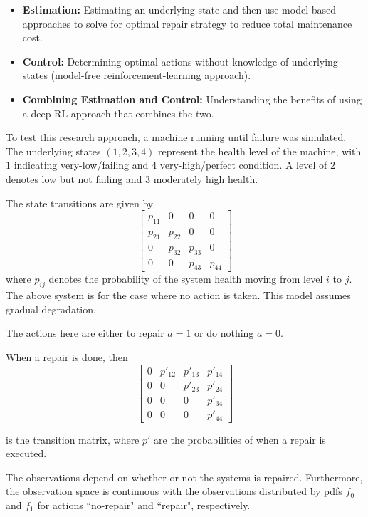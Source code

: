 \documentclass[english]{article}
\numberwithin{equation}{section}
\begin{document}
	\begin{itemize}
		\item \textbf{Estimation:} Estimating an underlying state and then use model-based approaches to solve for optimal repair strategy to reduce total maintenance cost.
		\item \textbf{Control:} Determining optimal actions without knowledge of underlying states (model-free reinforcement-learning approach).
		\item \textbf{Combining Estimation and Control:} Understanding the benefits of using a deep-RL approach that combines the two.
	\end{itemize}
	
	
	To test this research approach, a machine running until failure was simulated. The underlying states $(1,2,3,4)$ represent the health level of the machine, with $1$ indicating very-low/failing and $4$ very-high/perfect condition. A level of $2$ denotes low but not failing and $3$ moderately high health.
	
	The state transitions are given by 
	$$
	\begin{bmatrix}
	p_{11} & 0 & 0 & 0 \\
	p_{21} & p_{22} & 0 & 0 \\
	0 & p_{32} & p_{33} & 0 \\
	0 & 0 & p_{43} & p_{44}
	\end{bmatrix}
	$$
	where $p_{ij}$ denotes the probability of the system health moving from level $i$ to $j$. The above system is for the case where no action is taken. This model assumes gradual degradation.
	
	The actions here are either to repair $a=1$ or do nothing $a=0$.
	
	When a repair is done, then
	$$
	\begin{bmatrix}
	0 & p'_{12} & p'_{13} & p'_{14} \\
	0 & 0 & p'_{23} & p'_{24} \\
	0 & 0 & 0 & p'_{34} \\
	0 & 0 & 0 & p'_{44}
	\end{bmatrix}
	$$
	
	is the transition matrix, where $p'$ are the probabilities of when a repair is executed. 
	
	The observations depend on whether or not the systems is repaired. Furthermore, the observation space is continuous with the observations distributed by pdfs $f_0$ and $f_1$ for actions ``no-repair" and ``repair", respectively.
	
\end{document}
